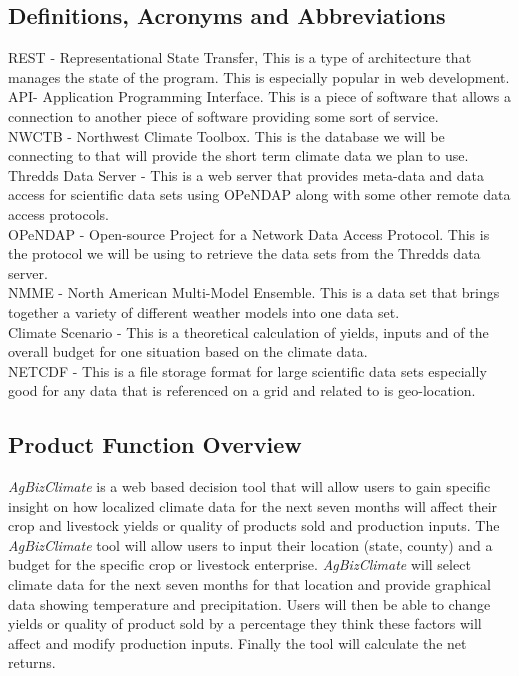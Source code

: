 \documentclass[onecolumn, draftclsnofoot,10pt, compsoc]{article}
\begin{document}
		\subsection{Definitions, Acronyms and Abbreviations}
			REST - Representational State Transfer, This is a type of architecture that manages the state of the program. This is especially popular in web development.\\
			API- Application Programming Interface. This is a piece of software that allows a connection to another piece of software providing some sort of service.\\
			NWCTB - Northwest Climate Toolbox. This is the database we will be connecting to that will provide the short term climate data we plan to use.\\
			Thredds Data Server - This is a web server that provides meta-data and data access for scientific data sets using OPeNDAP along with some other remote data access protocols.\\
			OPeNDAP - Open-source Project for a Network Data Access Protocol. This is the protocol we will be using to retrieve the data sets from the Thredds data server.\\
			NMME - North American Multi-Model Ensemble. This is a data set that brings together a variety of different weather models into one data set.\\
			Climate Scenario - This is a theoretical calculation of yields, inputs and of the overall budget for one situation based on the climate data.\\
			NETCDF - This is a file storage format for large scientific data sets especially good for any data that is referenced on a grid and related to is geo-location.\\
			
		
		\subsection{Product Function Overview}
		    \textit{AgBizClimate} is a web based decision tool that will allow users to gain specific insight on how localized climate data for the next seven months will affect their crop and livestock yields or quality of products sold and production inputs. The \textit{AgBizClimate} tool will allow users to input their location (state, county) and a budget for the specific crop or livestock enterprise. \textit{AgBizClimate} will select climate data for the next seven months for that location and provide graphical data showing temperature and precipitation. Users will then be able to change yields or quality of product sold by a percentage they think these factors will affect and modify production inputs. Finally the tool will calculate the net returns.\\
				
\end{document}
